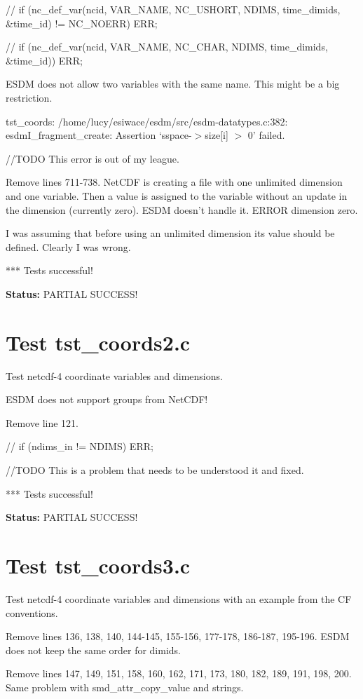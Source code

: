 //       if (nc\_def\_var(ncid, VAR\_NAME, NC\_USHORT, NDIMS, time\_dimids, \&time\_id) != NC\_NOERR) ERR;

//       if (nc\_def\_var(ncid, VAR\_NAME, NC\_CHAR, NDIMS, time\_dimids, \&time\_id)) ERR;

ESDM does not allow two variables with the same name. This might be a big restriction.

tst\_coords: /home/lucy/esiwace/esdm/src/esdm-datatypes.c:382: esdmI\_fragment\_create: Assertion `sspace-$>$size[i] $>$ 0' failed.

//TODO This error is out of my league.

Remove lines 711-738. NetCDF is creating a file with one unlimited dimension and one variable. Then a value is assigned to the variable without an update in the dimension (currently zero). ESDM doesn't handle it. ERROR dimension zero.

I was assuming that before using an unlimited dimension its value should be defined. Clearly I was wrong.

*** Tests successful!

{\bf \large Status: } PARTIAL SUCCESS!

\section{Test tst\_coords2.c}

Test netcdf-4 coordinate variables and dimensions.

ESDM does not support groups from NetCDF!

Remove line 121.

// if (ndims\_in != NDIMS) ERR;

//TODO This is a problem that needs to be understood it and fixed.

*** Tests successful!

{\bf \large Status: } PARTIAL SUCCESS!

\section{Test tst\_coords3.c}

Test netcdf-4 coordinate variables and dimensions with an example from the CF conventions.

Remove lines 136, 138, 140, 144-145, 155-156, 177-178, 186-187, 195-196. ESDM does not keep the same order for dimids.

Remove lines 147, 149, 151, 158, 160, 162, 171, 173, 180, 182, 189, 191, 198, 200. Same problem with smd\_attr\_copy\_value and strings.

